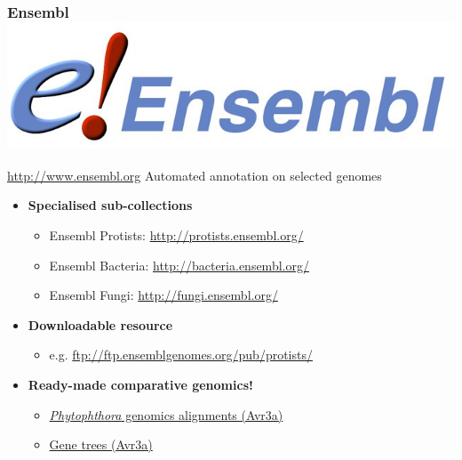 \begin{frame}
  \frametitle{Ensembl \hfill \includegraphics[height=0.1\textheight,valign=t]{images/ensembl_metazoa_logo}}
    \begin{alertblock}{\href{http://www.ensembl.org}{http://www.ensembl.org}}
      Automated annotation on selected genomes
    \end{alertblock}
    \begin{itemize}
      \item \textbf{Specialised sub-collections}
      \begin{itemize}
        \item Ensembl Protists: \textcolor{hutton_purple}{\href{http://protists.ensembl.org/}{http://protists.ensembl.org/}}
        \item Ensembl Bacteria: \textcolor{hutton_purple}{\href{http://bacteria.ensembl.org/}{http://bacteria.ensembl.org/}}
        \item Ensembl Fungi: \textcolor{hutton_purple}{\href{http://fungi.ensembl.org/}{http://fungi.ensembl.org/}}
      \end{itemize}
      \item \textbf{Downloadable resource}
      \begin{itemize}
        \item e.g. \textcolor{hutton_purple}{\href{http://ftp.ensemblgenomes.org/pub/protists/}{ftp://ftp.ensemblgenomes.org/pub/protists/}}
      \end{itemize}
      \item \textbf{Ready-made comparative genomics!}      
      \begin{itemize}
        \item \textcolor{hutton_purple}{\href{http://protists.ensembl.org/Phytophthora_infestans/Location/Compara_Alignments/Image?align=119329;db=core;r=supercont1.34:559462-573700}{\textit{Phytophthora} genomics alignments (Avr3a)}}
        \item \textcolor{hutton_purple}{\href{http://protists.ensembl.org/Phytophthora_infestans/Gene/Compara_Tree/pan_compara?db=core;g=PITG_14371;r=supercont1.34:559462-573700;t=PITG_14371T0}{Gene trees (Avr3a)}}
      \end{itemize}
    \end{itemize}
\end{frame}

